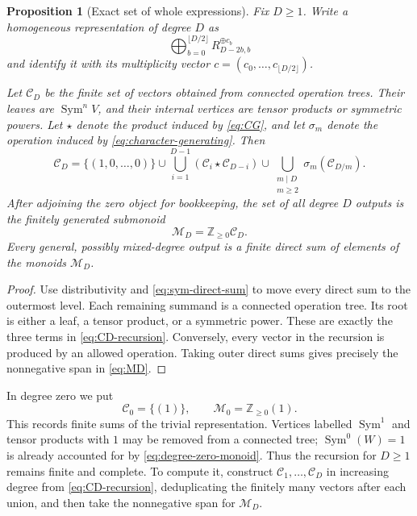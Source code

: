 \documentclass[11pt,reqno]{amsart}
\newtheorem{proposition}[theorem]{Proposition}
\theoremstyle{definition}
\theoremstyle{remark}
\newcommand{\Z}{\mathbb Z}
\newcommand{\Sym}{\operatorname{Sym}}
\begin{document}
\begin{proposition}[Exact set of whole expressions]\label{prop:whole-expressions}
Fix $D\geq1$.  Write a homogeneous representation of degree $D$ as
\begin{equation*}
 \bigoplus_{b=0}^{\lfloor D/2\rfloor}
 R_{D-2b,b}^{\oplus c_b}
\end{equation*}
and identify it with its multiplicity vector
$c=(c_0,\ldots,c_{\lfloor D/2\rfloor})$.

Let $\mathcal C_D$ be the finite set of vectors obtained from connected
operation trees.  Their leaves are $\Sym^nV$, and their internal vertices are
tensor products or symmetric powers.  Let $\star$ denote the product induced
by \eqref{eq:CG}, and let $\sigma_m$ denote the operation induced by
\eqref{eq:character-generating}.  Then
\begin{equation}\label{eq:CD-recursion}
 \mathcal C_D
 =
 \{(1,0,\ldots,0)\}
 \cup
 \bigcup_{i=1}^{D-1}
 \left(\mathcal C_i\star\mathcal C_{D-i}\right)
 \cup
 \bigcup_{\substack{m\mid D\\m\geq2}}
 \sigma_m\left(\mathcal C_{D/m}\right).
\end{equation}
After adjoining the zero object for bookkeeping, the set of all degree $D$
outputs is the finitely generated submonoid
\begin{equation}\label{eq:MD}
 \mathcal M_D=\Z_{\geq0}\mathcal C_D.
\end{equation}
Every general, possibly mixed-degree output is a finite direct sum of elements
of the monoids $\mathcal M_D$.
\end{proposition}

\begin{proof}
Use distributivity and \eqref{eq:sym-direct-sum} to move every direct sum to
the outermost level.  Each remaining summand is a connected operation tree.
Its root is either a leaf, a tensor product, or a symmetric power.  These are
exactly the three terms in \eqref{eq:CD-recursion}.  Conversely, every vector
in the recursion is produced by an allowed operation.  Taking outer direct
sums gives precisely the nonnegative span in \eqref{eq:MD}.
\end{proof}

In degree zero we put
\begin{equation}\label{eq:degree-zero-monoid}
 \mathcal C_0=\{(1)\},\qquad
 \mathcal M_0=\Z_{\geq0}(1).
\end{equation}
This records finite sums of the trivial representation.  Vertices labelled
$\Sym^1$ and tensor products with $1$ may be removed from a connected tree;
$\Sym^0(W)=1$ is already accounted for by \eqref{eq:degree-zero-monoid}.
Thus the recursion for $D\geq1$ remains finite and complete.
To compute it, construct $\mathcal C_1,\ldots,\mathcal C_D$ in increasing
degree from \eqref{eq:CD-recursion}, deduplicating the finitely many vectors
after each union, and then take the nonnegative span for $\mathcal M_D$.
\end{document}
